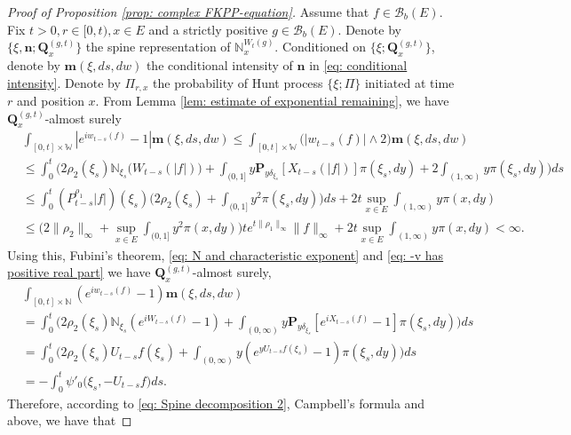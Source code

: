\documentclass[12pt,a4paper]{amsart}
\theoremstyle{plain}
\theoremstyle{definition}
\numberwithin{equation}{section}
\begin{document}
\begin{proof}[Proof of Proposition \ref{prop: complex FKPP-equation}]
  Assume that $f\in \mathcal B_b(E)$.
  Fix $t>0, r\in [0,t), x\in E$ and a strictly positive $g\in \mathcal B_b(E)$.
  Denote by $\{\xi, \mathbf n; \mathbf Q_x^{(g,t)}\}$ the spine representation of $\mathbb N_x^{W_t(g)}$.
  Conditioned on $\{\xi; \mathbf Q_x^{(g,t)}\}$, denote by $\mathbf m(\xi, ds,dw)$ the conditional intensity of $\mathbf n$ in \eqref{eq: conditional intensity}.
  Denote by $\Pi_{r,x}$ the probability of Hunt process $\{\xi; \Pi\}$ initiated at time $r$ and position $x$.
  From Lemma \ref{lem: estimate of exponential remaining}, we have $\mathbf Q^{(g,t)}_{x}$-almost surely
  \begin{align}
    & \int_{[0,t]\times \mathbb W}|e^{i w_{t-s}(f)} - 1| \mathbf m(\xi, ds,dw)
      \leq \int_{[0,t]\times \mathbb W}\big(| w_{t-s}(f)| \wedge 2\big) \mathbf m(\xi, ds,dw) \\
    & \leq \int_0^t \Big(2\rho_2(\xi_s)\mathbb N_{\xi_s}\big( W_{t-s}(|f|)\big)  + \int_{(0,1]} y \mathbf P_{y \delta_{\xi_s}}[X_{t-s}(|f|)] \pi(\xi_s,dy)
   + 2\int_{(1,\infty)}y\pi(\xi_s,dy)\Big) ds
    \\ & \leq \int_0^t (P_{t-s}^{\rho_1} |f|)(\xi_s)\Big(2\rho_2(\xi_s)  + \int_{(0,1]} y^2 \pi(\xi_s,dy)\Big) ds + 2t \sup_{x\in E}\int_{(1,\infty)}y\pi(x,dy)
    \\ & \leq \Big(2\|\rho_2\|_\infty +\sup_{x\in E}\int_{(0,1]} y^2 \pi(x,dy)\Big) t e^{t\|\rho_1\|_\infty}\|f\|_\infty + 2t \sup_{x\in E}\int_{(1,\infty)}y\pi(x,dy)
         < \infty.
  \end{align}
  Using this, Fubini's theorem, \eqref{eq: N and characteristic exponent} and \eqref{eq: -v has positive real part} we have $\mathbf Q^{(g,t)}_{x}$-almost surely,
  \begin{align}
    & \int_{[0,t]\times \mathbb N}(e^{i  w_{t-s}(f)} - 1) \mathbf m(\xi, ds,dw)
    \\ & =\int_0^t \Big(2\rho_2(\xi_s)\mathbb N_{\xi_s}(e^{i W_{t-s}(f)} - 1)  + \int_{(0,\infty)} y \mathbf P_{y \delta_{\xi_s}}[e^{i X_{t-s}(f)} - 1] \pi(\xi_s,dy)\Big) ds
    \\ & =\int_0^t \Big( 2\rho_2(\xi_s) U_{t-s} f(\xi_s) + \int_{(0,\infty)} y (e^{y U_{t-s}f(\xi_s)} - 1) \pi(\xi_s,dy) \Big) ds
    \\ & = -\int_0^t \psi'_0 \big(\xi_s, -U_{t-s}f\big)ds.
  \end{align}
  Therefore, according to \eqref{eq: Spine decomposition 2}, Campbell's formula and above, we have that

\end{proof}
\end{document}
